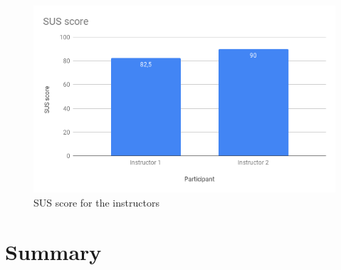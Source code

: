 \documentclass[../Main/thesis.tex]{subfiles}
\begin{document}
\begin{figure}
	\centering
	\includegraphics[width=\textwidth]{../fig/sus-instructors.png}
	\caption{SUS score for the instructors}
	\label{fig:sus-instructors}
\end{figure}

\section{Summary}
\end{document}
